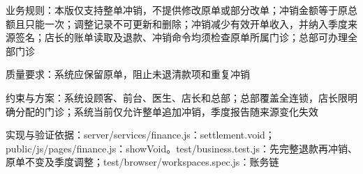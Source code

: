 \documentclass[UTF8,12pt,a4paper,fontset=none]{ctexart}
\begin{document}
业务规则：本版仅支持整单冲销，不提供修改原单或部分改单；冲销金额等于原总额且只能一次；调整记录不可更新和删除；冲销减少有效开单收入，并纳入季度来源签名；店长的账单读取及退款、冲销命令均须检查原单所属门诊；总部可办理全部门诊\par
质量要求：系统应保留原单，阻止未退清款项和重复冲销\par
约束与方案：系统设顾客、前台、医生、店长和总部；总部覆盖全连锁，店长限明确分配的门诊；系统当前仅允许整单追加冲销，季度报告随来源变化失效\par
实现与验证依据：server/\allowbreak{}services/\allowbreak{}finance.\allowbreak{}js：settlement.\allowbreak{}void；public/\allowbreak{}js/\allowbreak{}pages/\allowbreak{}finance.\allowbreak{}js：showVoid。test/\allowbreak{}business.\allowbreak{}test.\allowbreak{}js：先完整退款再冲销、原单不变及季度调整；test/\allowbreak{}browser/\allowbreak{}workspaces.\allowbreak{}spec.\allowbreak{}js：账务链\par
{}
\end{document}
